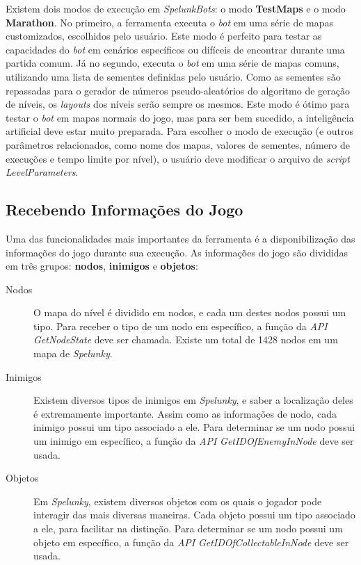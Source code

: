 Existem dois modos de execução em \textit{SpelunkBots}: o modo \textbf{TestMaps}
e o modo \textbf{Marathon}. No primeiro, a ferramenta executa o \textit{bot} em
uma série de mapas customizados, escolhidos pelo usuário. Este modo é perfeito
para testar as capacidades do \textit{bot} em cenários específicos ou difíceis
de encontrar durante uma partida comum. Já no segundo, executa o \textit{bot} em
uma série de mapas comuns, utilizando uma lista de sementes definidas pelo
usuário. Como as sementes são repassadas para o gerador de números
pseudo-aleatórios do algoritmo de geração de níveis, os \textit{layouts} dos
níveis serão sempre os mesmos. Este modo é ótimo para testar o \textit{bot} em
mapas normais do jogo, mas para ser bem sucedido, a inteligência artificial deve
estar muito preparada. Para escolher o modo de execução (e outros parâmetros
relacionados, como nome dos mapas, valores de sementes, número de execuções e
tempo limite por nível), o usuário deve modificar o arquivo de \textit{script}
\textit{LevelParameters}.


\subsection{\label{section:spelunkbots-information}Recebendo Informações do
Jogo}
Uma das funcionalidades mais importantes da ferramenta é a disponibilização das
informações do jogo durante sua execução. As informações do jogo são divididas
em três grupos: \textbf{nodos}, \textbf{inimigos} e \textbf{objetos}:

\begin{description}
	\item[Nodos]
		O mapa do nível é dividido em nodos, e cada um destes nodos possui um
		tipo.  Para receber o tipo de um nodo em específico, a função da
		\textit{API} \textit{GetNodeState} deve ser chamada. Existe um total de
		1428 nodos em um mapa de \textit{Spelunky}.

	\item[Inimigos]
		Existem diversos tipos de inimigos em \textit{Spelunky}, e saber a
		localização deles é extremamente importante. Assim como as informações
		de nodo, cada inimigo possui um tipo associado a ele. Para determinar se
		um nodo possui um inimigo em específico, a função da \textit{API}
		\textit{GetIDOfEnemyInNode} deve ser usada.

	\item[Objetos]
		Em \textit{Spelunky}, existem diversos objetos com os quais o jogador
		pode interagir das mais diversas maneiras. Cada objeto possui um tipo
		associado a ele, para facilitar na distinção. Para determinar se um nodo
		possui um objeto em específico, a função da \textit{API}
		\textit{GetIDOfCollectableInNode} deve ser usada.
\end{description}


